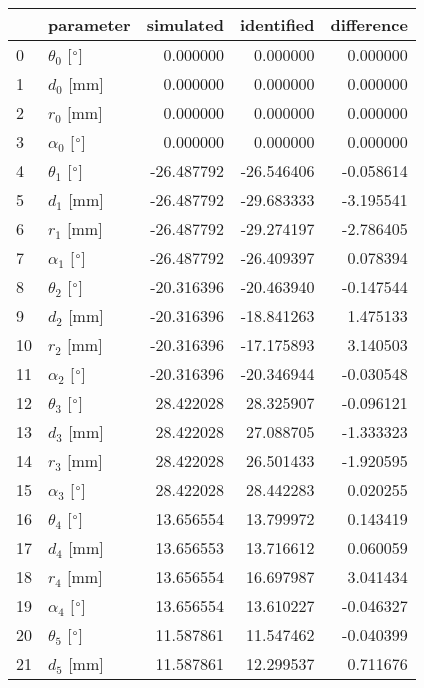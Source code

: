 \documentclass{standalone}%
\begin{document}
%
\normalsize%
\begin{tabular}{llrrr}
\toprule
{} &                 parameter &  simulated & identified & difference \\
\midrule
0  &  $\theta_{0}$ [$\degree$] &   0.000000 &   0.000000 &   0.000000 \\
1  &              $d_{0}$ [mm] &   0.000000 &   0.000000 &   0.000000 \\
2  &              $r_{0}$ [mm] &   0.000000 &   0.000000 &   0.000000 \\
3  &  $\alpha_{0}$ [$\degree$] &   0.000000 &   0.000000 &   0.000000 \\
4  &  $\theta_{1}$ [$\degree$] & -26.487792 & -26.546406 &  -0.058614 \\
5  &              $d_{1}$ [mm] & -26.487792 & -29.683333 &  -3.195541 \\
6  &              $r_{1}$ [mm] & -26.487792 & -29.274197 &  -2.786405 \\
7  &  $\alpha_{1}$ [$\degree$] & -26.487792 & -26.409397 &   0.078394 \\
8  &  $\theta_{2}$ [$\degree$] & -20.316396 & -20.463940 &  -0.147544 \\
9  &              $d_{2}$ [mm] & -20.316396 & -18.841263 &   1.475133 \\
10 &              $r_{2}$ [mm] & -20.316396 & -17.175893 &   3.140503 \\
11 &  $\alpha_{2}$ [$\degree$] & -20.316396 & -20.346944 &  -0.030548 \\
12 &  $\theta_{3}$ [$\degree$] &  28.422028 &  28.325907 &  -0.096121 \\
13 &              $d_{3}$ [mm] &  28.422028 &  27.088705 &  -1.333323 \\
14 &              $r_{3}$ [mm] &  28.422028 &  26.501433 &  -1.920595 \\
15 &  $\alpha_{3}$ [$\degree$] &  28.422028 &  28.442283 &   0.020255 \\
16 &  $\theta_{4}$ [$\degree$] &  13.656554 &  13.799972 &   0.143419 \\
17 &              $d_{4}$ [mm] &  13.656553 &  13.716612 &   0.060059 \\
18 &              $r_{4}$ [mm] &  13.656554 &  16.697987 &   3.041434 \\
19 &  $\alpha_{4}$ [$\degree$] &  13.656554 &  13.610227 &  -0.046327 \\
20 &  $\theta_{5}$ [$\degree$] &  11.587861 &  11.547462 &  -0.040399 \\
21 &              $d_{5}$ [mm] &  11.587861 &  12.299537 &   0.711676 \\

\end{tabular}
\end{document}
